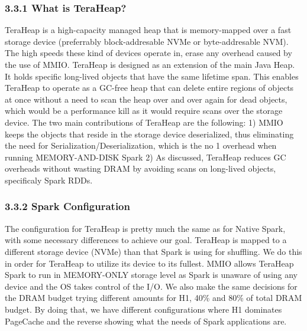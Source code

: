 \documentclass[twocolumn,10pt]{asme2e}
\begin{document}
\subsubsection*{3.3.1 What is TeraHeap?}
TeraHeap is a high-capacity managed heap that is memory-mapped over a fast storage device (preferrably block-addresable NVMe or byte-addresable NVM). The high speeds these kind of devices operate in, erase any overhead caused by the use of MMIO. TeraHeap is designed as an extension of the main Java Heap. It holds specific long-lived objects that have the same lifetime span. This enables TeraHeap to operate as a GC-free heap that can delete entire regions of objects at once without a need to scan the heap over and over again for dead objects, which would be a performance kill as it would require scans over the storage device. The two main contributions of TeraHeap are the following: 1) MMIO keeps the objects that reside in the storage device deserialized, thus eliminating the need for Serialization/Deserialization, which is the no 1 overhead when running MEMORY-AND-DISK Spark 2) As discussed, TeraHeap reduces GC overheads without wasting DRAM by avoiding scans on long-lived objects, specificaly Spark RDDs.

\subsubsection*{3.3.2 Spark Configuration}
The configuration for TeraHeap is pretty much the same as for Native Spark, with some necessary differences to achieve our goal. TeraHeap is mapped to a different storage device (NVMe) than that Spark is using for shuffling. We do this in order for TeraHeap to utilize its device to its fullest. MMIO allows TeraHeap Spark to run in MEMORY-ONLY storage level as Spark is unaware of using any device and the OS takes control of the I/O. We also make the same decisions for the DRAM budget trying different amounts for H1, 40\% and 80\% of total DRAM budget. By doing that, we have different configurations where H1 dominates PageCache and the reverse showing what the needs of Spark applications are. 
\end{document}
